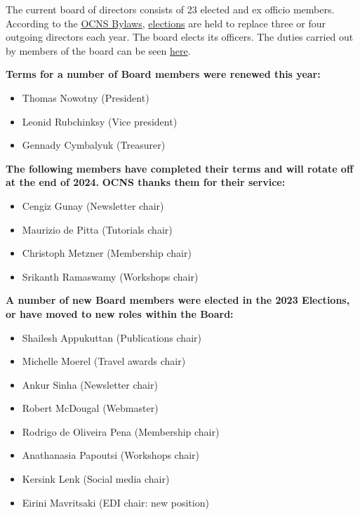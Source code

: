 \documentclass[11pt,a4paper,oneside]{article}
\begin{document}
The current board of directors consists of 23 elected and ex officio members.
According to the \href{https://www.cnsorg.org/ocns-bylaws-2011}{OCNS Bylaws}, \href{https://www.cnsorg.org/election-procedures}{elections} are held to replace three or four outgoing directors each year.
The board elects its officers.
The duties carried out by members of the board can be seen \href{https://www.cnsorg.org/quick-director-duties}{here}.

\textbf{Terms for a number of Board members were renewed this year:}
\begin{multicols}{2}
  \begin{itemize}
    \item Thomas Nowotny (President)
    \item Leonid Rubchinksy (Vice president)
    \item Gennady Cymbalyuk (Treasurer)
  \end{itemize}
\end{multicols}

\textbf{The following members have completed their terms and will rotate off at the end of 2024.}
\textbf{OCNS thanks them for their service:}
\begin{multicols}{2}
  \begin{itemize}
    \item Cengiz Gunay (Newsletter chair)
    \item Maurizio de Pitta (Tutorials chair)
    \item Christoph Metzner (Membership chair)
    \item Srikanth Ramaswamy (Workshops chair)
  \end{itemize}
\end{multicols}

\textbf{A number of new Board members were elected in the 2023 Elections, or have moved to new roles within the Board:}
\begin{multicols}{2}
  \begin{itemize}
    \item Shailesh Appukuttan (Publications chair)
    \item Michelle Moerel (Travel awards chair)
    \item Ankur Sinha (Newsletter chair)
    \item Robert McDougal (Webmaster)
    \item Rodrigo de Oliveira Pena (Membership chair)
    \item Anathanasia Papoutsi (Workshops chair)
    \item Kersink Lenk (Social media chair)
    \item Eirini Mavritsaki (EDI chair: new position)
  \end{itemize}
\end{multicols}
\end{document}
